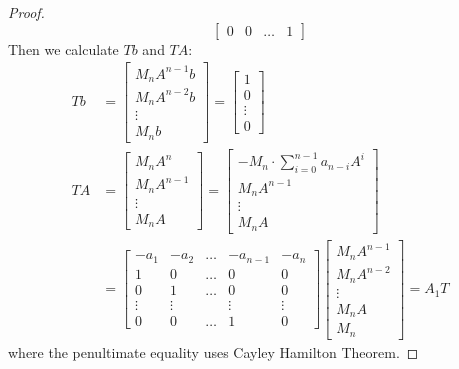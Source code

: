 \documentclass[
]{book}
\theoremstyle{definition}
\theoremstyle{definition}
\theoremstyle{definition}
\theoremstyle{definition}
\theoremstyle{remark}
\begin{document}
\begin{proof}
\begin{equation*}
\begin{bmatrix}
      0 & 0 & \dots & 1
   \end{bmatrix}
\end{equation*}
Then we calculate \(Tb\) and \(TA\):
\begin{equation*}
   \begin{split}
      Tb & = \begin{bmatrix}
         M_n A^{n-1}b \\ M_n A^{n-2}b \\ \vdots \\ M_n b
      \end{bmatrix} = \begin{bmatrix}
         1 \\ 0 \\ \vdots \\ 0
      \end{bmatrix} \\
      T A & = \begin{bmatrix}
         M_n A^n \\ M_n A^{n-1} \\ \vdots \\ M_n A
      \end{bmatrix} = \begin{bmatrix}
         -M_n \cdot \sum_{i=0}^{n-1} a_{n-i} A^i \\ M_n A^{n-1} \\ \vdots \\ M_n A
      \end{bmatrix} \\
      & = \begin{bmatrix}
            -a_1 & -a_2 & \dots & -a_{n-1} & -a_n \\
            1 & 0 & \dots & 0 & 0 \\
            0 & 1 & \dots & 0 & 0 \\
            \vdots & \vdots &  & \vdots & \vdots \\
            0 & 0 & \dots & 1 & 0
      \end{bmatrix} \begin{bmatrix}
         M_n A^{n-1} \\ M_n A^{n-2} \\ \vdots \\ M_n A \\ M_n
      \end{bmatrix} = A_1 T
   \end{split}
\end{equation*}
where the penultimate equality uses Cayley Hamilton Theorem.
\end{proof}
\end{document}
